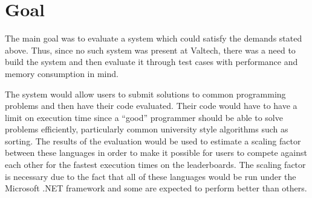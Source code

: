 \section{Goal}
The main goal was to evaluate a system which could satisfy the demands stated above. Thus, since no such system was present at Valtech, there was a need to build the system and then evaluate it through test cases with performance and memory consumption in mind.

The system would allow users to submit solutions to common programming problems and then have their code evaluated. Their code would have to have a limit on execution time since a ``good'' programmer should be able to solve problems efficiently, particularly common university style algorithms such as sorting. The results of the evaluation would be used to estimate a scaling factor between these languages in order to make it possible for users to compete against each other for the fastest execution times on the leaderboards. The scaling factor is necessary due to the fact that all of these languages would be run under the Microsoft .NET framework and some are expected to perform better than others.
